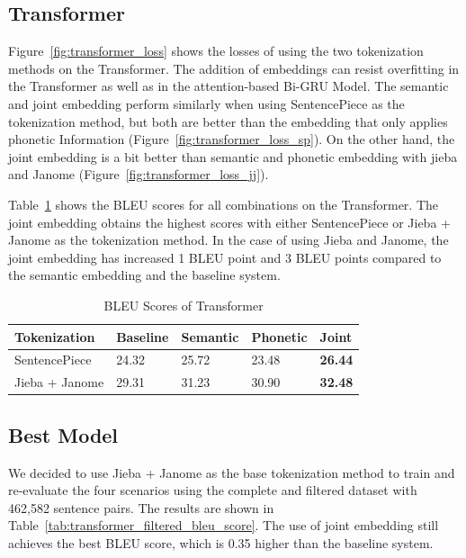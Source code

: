 \subsection{Transformer}

Figure~\ref{fig:transformer_loss} shows the losses of using the two tokenization methods on the Transformer. The addition of embeddings can resist overfitting in the Transformer as well as in the attention-based Bi-GRU Model. The semantic and joint embedding perform similarly when using SentencePiece as the tokenization method, but both are better than the embedding that only applies phonetic Information (Figure~\ref{fig:transformer_loss_sp}). On the other hand, the joint embedding is a bit better than semantic and phonetic embedding with jieba and Janome (Figure~\ref{fig:transformer_loss_jj}).

Table~\ref{tab:transformer_bleu_score} shows the BLEU scores for all combinations on the Transformer. The joint embedding obtains the highest scores with either SentencePiece or Jieba + Janome as the tokenization method. In the case of using Jieba and Janome, the joint embedding has increased 1 BLEU point and 3 BLEU points compared to the semantic embedding and the baseline system.

\vspace{0.5cm}
\begin{table}[h]
    \centering
    \begin{tabularx}{\textwidth}{bbbbb}\toprule
        Tokenization & Baseline & Semantic & Phonetic & Joint \\\midrule
        SentencePiece & 24.32 & 25.72 & 23.48 & \textbf{26.44} \\
        Jieba + Janome & 29.31 & 31.23 & 30.90 & \textbf{32.48} \\\bottomrule
    \end{tabularx}
    \caption{BLEU Scores of Transformer}
    \label{tab:transformer_bleu_score}
\end{table}

\subsection{Best Model}

We decided to use Jieba + Janome as the base tokenization method to train and re-evaluate the four scenarios using the complete and filtered dataset with 462,582 sentence pairs. The results are shown in Table~\ref{tab:transformer_filtered_bleu_score}. The use of joint embedding still achieves the best BLEU score, which is 0.35 higher than the baseline system.

